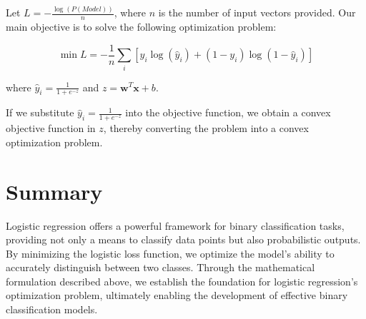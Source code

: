 \documentclass{article}
\begin{document}
Let \( L = -\frac{\log(P(Model))}{n} \), where \( n \) is the number of input vectors provided. Our main objective is to solve the following optimization problem:

\[ \min L = -\frac{1}{n} \sum_{i} [y_i \log(\hat{y}_i) + (1 - y_i) \log(1 - \hat{y}_i)] \]

where \( \hat{y}_i = \frac{1}{1+e^{-z}} \) and \( z = \mathbf{w}^T \mathbf{x} + b \).

If we substitute \( \hat{y}_i = \frac{1}{1+e^{-z}} \) into the objective function, we obtain a convex objective function in \( z \), thereby converting the problem into a convex optimization problem.

\section*{Summary}

Logistic regression offers a powerful framework for binary classification tasks, providing not only a means to classify data points but also probabilistic outputs. By minimizing the logistic loss function, we optimize the model's ability to accurately distinguish between two classes. Through the mathematical formulation described above, we establish the foundation for logistic regression's optimization problem, ultimately enabling the development of effective binary classification models.
\end{document}
